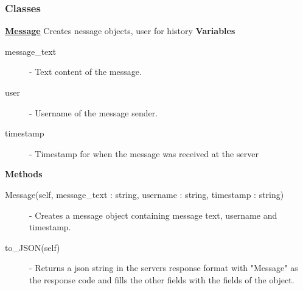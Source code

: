 \documentclass[a4paper, 12pt]{article}
\begin{document}
        \subsubsection{Classes}
            \textbf{\underline{Message}}
            \newline
            \newline
                Creates nessage objects, user for history
                \newline
                \newline
                \textbf{Variables}
                    \begin{description}
                        \item[message\_text] - Text content of the message.
                        \item[user] - Username of the message sender.
                        \item[timestamp] - Timestamp for when the message was received at the server
                    \end{description}
                \textbf{Methods}
                    \begin{description}
                        \item[Message(self, message\_text : string, username : string, timestamp : string)] - Creates a message object containing message text, username and timestamp.
                        \item[to\_JSON(self)] - Returns a json string in the servers response format with "Message" as the response code and fills the other fields with the fields of the object.
                    \end{description}
\end{document}
